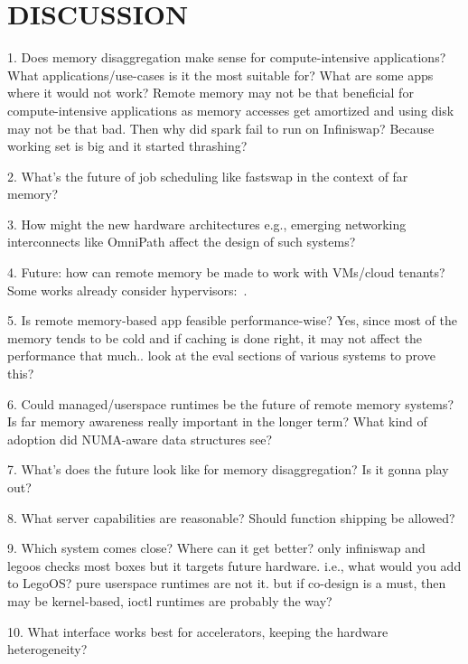 \section{DISCUSSION}
\label{sec:discussion}

1. Does memory disaggregation make sense for 
compute-intensive applications? What applications/use-cases
is it the most suitable for? What are some apps where it 
would not work? Remote memory may not be that beneficial for 
compute-intensive applications as memory accesses 
get amortized and using disk may not be that bad. 
Then why did spark fail to run on Infiniswap? 
Because working set is big and it started thrashing? 

2. What's the future of job scheduling like 
fastswap in the context of far memory? 

3. How might the new hardware architectures e.g., 
emerging networking interconnects like OmniPath 
affect the design of such systems? 

4. Future: how can remote memory be made to work 
with VMs/cloud tenants? Some works already 
consider hypervisors:~\cite{Lim2012}. 

5. Is remote memory-based app feasible performance-wise?
Yes, since most of the memory tends to be cold and 
if caching is done right, it may not affect the 
performance that much.. look at the eval sections of 
various systems to prove this?

6. Could managed/userspace runtimes be the future of 
remote memory systems? Is far memory awareness really 
important in the longer term? What kind of adoption did 
NUMA-aware data structures see? 

7. What's does the future look like for memory disaggregation?
Is it gonna play out?

8. What server capabilities are reasonable? Should function 
shipping be allowed?

9. Which system comes close? Where can it get better?
only infiniswap and legoos checks most boxes but 
it targets future hardware.
i.e., what would you add to LegoOS?
pure userspace runtimes are not it. but if co-design is 
a must, then may be kernel-based, ioctl runtimes are 
probably the way?

10. What interface works best for accelerators, keeping 
the hardware heterogeneity? 

